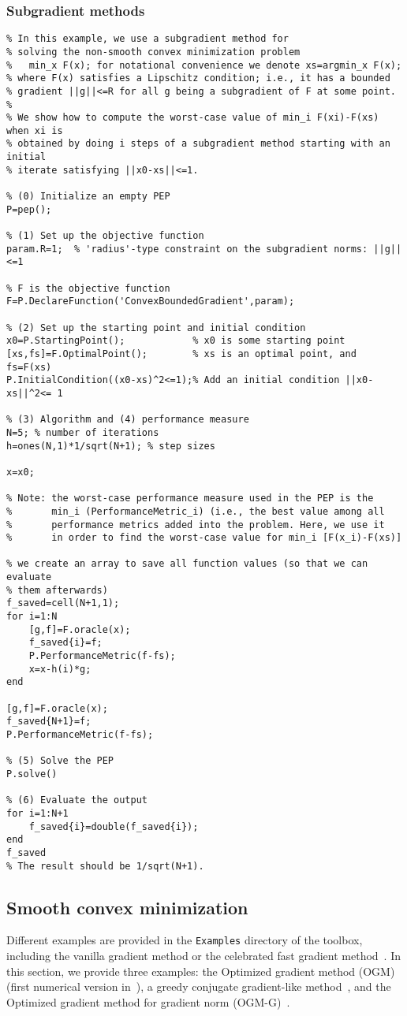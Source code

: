 \documentclass[11pt,a4paper]{article}
\begin{document}
\subsubsection{Subgradient methods}
\begin{lstlisting}
% In this example, we use a subgradient method for
% solving the non-smooth convex minimization problem
%   min_x F(x); for notational convenience we denote xs=argmin_x F(x);
% where F(x) satisfies a Lipschitz condition; i.e., it has a bounded
% gradient ||g||<=R for all g being a subgradient of F at some point.
%
% We show how to compute the worst-case value of min_i F(xi)-F(xs) when xi is
% obtained by doing i steps of a subgradient method starting with an initial
% iterate satisfying ||x0-xs||<=1.

% (0) Initialize an empty PEP
P=pep();

% (1) Set up the objective function
param.R=1;	% 'radius'-type constraint on the subgradient norms: ||g||<=1

% F is the objective function
F=P.DeclareFunction('ConvexBoundedGradient',param); 

% (2) Set up the starting point and initial condition
x0=P.StartingPoint();            % x0 is some starting point
[xs,fs]=F.OptimalPoint();        % xs is an optimal point, and fs=F(xs)
P.InitialCondition((x0-xs)^2<=1);% Add an initial condition ||x0-xs||^2<= 1

% (3) Algorithm and (4) performance measure
N=5; % number of iterations
h=ones(N,1)*1/sqrt(N+1); % step sizes

x=x0;

% Note: the worst-case performance measure used in the PEP is the 
%       min_i (PerformanceMetric_i) (i.e., the best value among all
%       performance metrics added into the problem. Here, we use it
%       in order to find the worst-case value for min_i [F(x_i)-F(xs)]

% we create an array to save all function values (so that we can evaluate
% them afterwards)
f_saved=cell(N+1,1);
for i=1:N
	[g,f]=F.oracle(x);
	f_saved{i}=f;
	P.PerformanceMetric(f-fs);
	x=x-h(i)*g;
end

[g,f]=F.oracle(x);
f_saved{N+1}=f;
P.PerformanceMetric(f-fs);

% (5) Solve the PEP
P.solve()

% (6) Evaluate the output
for i=1:N+1
	f_saved{i}=double(f_saved{i});
end
f_saved
% The result should be 1/sqrt(N+1).
\end{lstlisting}
\newpage
\subsection{Smooth convex minimization}
Different examples are provided in the \verb?Examples? directory of the toolbox, including the vanilla gradient method or the celebrated fast gradient method~\cite{Nesterov:1983wy}. In this section, we provide three examples: the Optimized gradient method (OGM)~\cite{kim2014optimized} (first numerical version in~\cite{Article:Drori,drori2014contributions}), a greedy conjugate gradient-like method~\cite{drori2018efficient}, and the Optimized gradient method for gradient norm (OGM-G)~\cite{kim2018optimizing}. 
\end{document}
